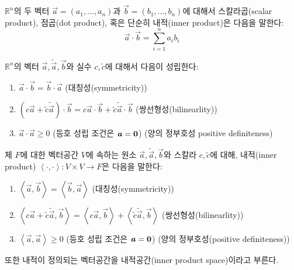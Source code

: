 \documentclass[../engineering_mathematics_lecture_note.tex]{subfiles}
\begin{document}
\begin{definition}
    $\mathbb R^n$의 두 벡터 $\vec a = (a_1, \dots, a_n)$과 $\vec b = (b_1, \dots, b_n)$에 대해서 스칼라곱(scalar product), 점곱(dot product), 혹은 단순히 내적(inner product)은 다음을 말한다:
    \begin{equation*}
        \vec a \cdot \vec b = \sum_{i = 1}^n a_i b_i
    \end{equation*}
\end{definition}

\begin{theorem}
    $\mathbb R^n$의 벡터 $\vec a, \tilde{\vec a}, \vec b$와 실수 $c, \tilde c$에 대해서 다음이 성립한다:
    \begin{enumerate}
        \item $\vec a \cdot \vec b = \vec b \cdot \vec a$ (대칭성(symmetricity))
        \item $(c \vec a + \tilde c \tilde{\vec a}) \cdot \vec b = c \vec a \cdot \vec b + \tilde c \tilde{\vec a} \cdot \vec b$ (쌍선형성(bilinearlity))
        \item $\vec a \cdot \vec a \geq 0$ (등호 성립 조건은 $\bm{\mathit{a}} = \bm{\mathrm{0}}$) (양의 정부호성 positive definiteness)
    \end{enumerate}
\end{theorem}

\begin{definition}
    체 $F$에 대한 벡터공간 $V$에 속하는 원소 $\vec a, \tilde{\vec a}, \vec b$와 스칼라 $c, \tilde c$에 대해, 내적(inner product) $\left<\cdot, \cdot\right>: V \times V \rightarrow F$은 다음을 말한다:
    \begin{enumerate}
        \item $\left<\vec a, \vec b\right> = \left<\vec b, \vec a\right>$ (대칭성(symmetricity))
        \item $\left<c \vec a + \tilde c \tilde{\vec a}, \vec b\right> = \left<c \vec a, \vec b\right> + \left<\tilde c \tilde{\vec a}, \vec b\right>$ (쌍선형성(bilinearlity))
        \item $\left<\vec a, \vec a\right> \geq 0$ (등호 성립 조건은 $\bm{\mathit{a}} = \bm{\mathrm{0}}$) (양의 정부호성(positive definiteness))
    \end{enumerate}
    또한 내적이 정의되는 벡터공간을 내적공간(inner product space)이라고 부른다.
\end{definition}
\end{document}
